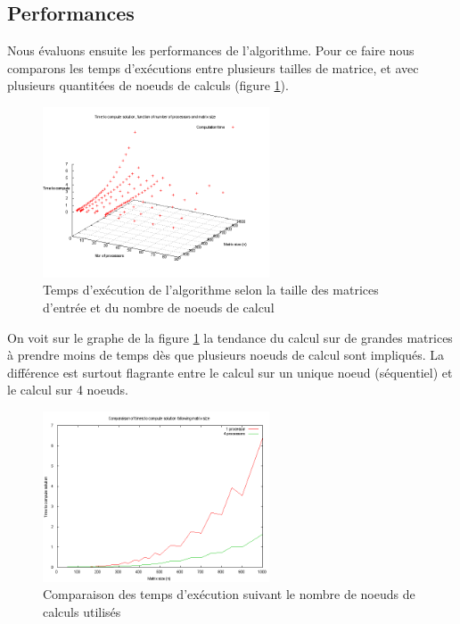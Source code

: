 \documentclass{article}
\begin{document}
\subsection{Performances}
Nous évaluons ensuite les performances de l'algorithme. Pour ce faire nous comparons les temps d'exécutions entre plusieurs tailles de matrice, et avec plusieurs quantitées de noeuds de calculs (figure \ref{fig:graph_all}).\\

\begin{figure}[h]
\centering
\includegraphics[width=0.6\textwidth]{../perf/results.png}
\caption{Temps d'exécution de l'algorithme selon la taille des matrices d'entrée et du nombre de noeuds de calcul}
\label{fig:graph_all}
\end{figure}

On voit sur le graphe de la figure \ref{fig:graph_all} la tendance du calcul sur de grandes matrices à prendre moins de temps dès que plusieurs noeuds de calcul sont impliqués. La différence est surtout flagrante entre le calcul sur un unique noeud (séquentiel) et le calcul sur 4 noeuds.\\

\begin{figure}[h]
\centering
\includegraphics[width=0.6\textwidth]{../perf/results_comp.png}
\caption{Comparaison des temps d'exécution suivant le nombre de noeuds de calculs utilisés}
\label{fig:graph_comp}
\end{figure}
\end{document}
